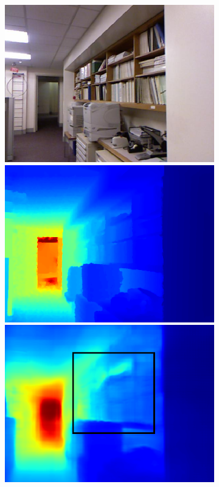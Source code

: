 \begin{figure}[htb]
  \centering
  \begin{subfigure}{0.15\linewidth}
    
  \begin{minipage}[t]{1\linewidth}
  \centering
  \includegraphics[width=1\linewidth]{figure/nyu_rgb/15.png}
  \includegraphics[width=1\linewidth]{figure/nyu_gt/15.png}
  \includegraphics[width=1\linewidth]{figure/nyu_result/office_rgb_00015.png}

\end{minipage}
\end{subfigure}
\end{figure}
